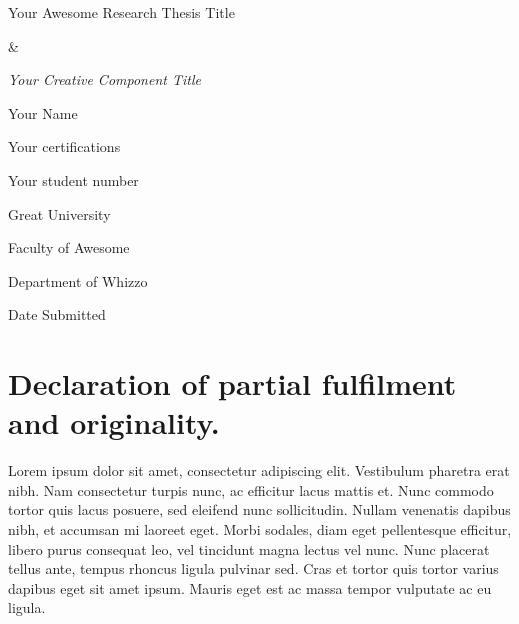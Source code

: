 \documentclass[a4paper]{memoir}
\begin{document}
\frontmatter

\vspace*{2.5cm}
\begin{center}
    \huge{Your Awesome Research Thesis Title}

    \huge{\&}

    \emph{\huge{Your Creative Component Title}}


\vspace{2.5cm}
    \Large{Your Name}

    \normalsize{Your certifications}

    Your student number

\vspace{2cm}
    \Large{Great University}

    \normalsize{Faculty of Awesome}

    Department of Whizzo

    Date Submitted


\end{center}


\pagebreak


\chapter*{Declaration of partial fulfilment and originality.}
\label{declarationofpartialfulfilmentandoriginality.}

Lorem ipsum dolor sit amet, consectetur adipiscing elit. Vestibulum pharetra erat nibh. Nam consectetur turpis nunc, ac efficitur lacus mattis et. Nunc commodo tortor quis lacus posuere, sed eleifend nunc sollicitudin. Nullam venenatis dapibus nibh, et accumsan mi laoreet eget. Morbi sodales, diam eget pellentesque efficitur, libero purus consequat leo, vel tincidunt magna lectus vel nunc. Nunc placerat tellus ante, tempus rhoncus ligula pulvinar sed. Cras et tortor quis tortor varius dapibus eget sit amet ipsum. Mauris eget est ac massa tempor vulputate ac eu ligula. 
\end{document}
